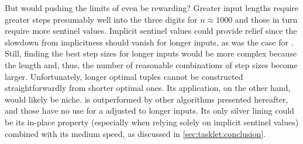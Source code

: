 But would pushing the limits of \ShS{} even be rewarding?
Greater input lengths require greater steps \Dash presumably well into the three digits for \(n \approx 1000\) \cite{skean2023optimization,10.1007/3-540-44669-9_12} \Dash and those in turn require more sentinel values.
Implicit sentinel values could provide relief since the slowdown from implicitness should vanish for longer inputs, as was the case for \IS{}.
Still, finding the best step sizes for longer inputs would be more complex because the length and, thus, the number of reasonable combinations of step sizes become larger.
Unfortunately, longer optimal tuples cannot be constructed straightforwardly from shorter optimal ones.
Its application, on the other hand, would likely be niche.
\ShS{} is outperformed by other algorithms presented hereafter, and those have no use for a \ShS{} adjusted to longer inputs.
Its only silver lining could be its in-place property (especially when relying solely on implicit sentinel values) combined with its medium speed, as discussed in \cref{sec:tasklet:conclusion}.
